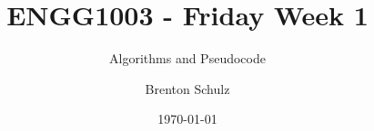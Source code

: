 \documentclass[17pt]{article}
\title{ENGG1003 - Friday Week 1}
\subtitle{Algorithms and Pseudocode}
\author{Brenton Schulz}
\institute{University of Newcastle}
\date{\today}
\begin{document}
\titlepage
\end{document}
